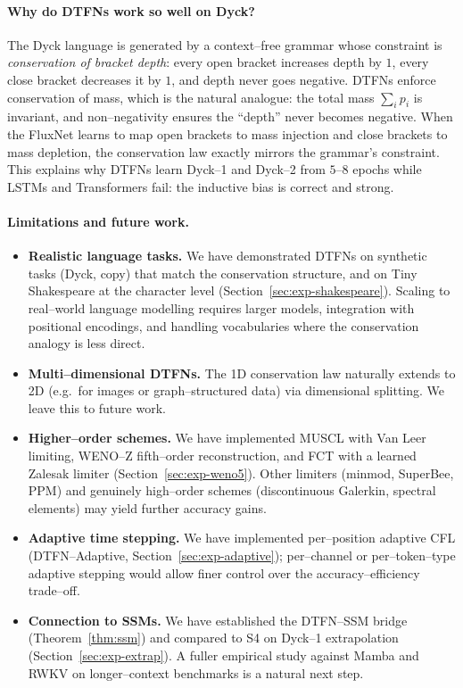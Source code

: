 \documentclass[10pt]{article}
\theoremstyle{definition}
\theoremstyle{remark}
\begin{document}
\paragraph{Why do DTFNs work so well on Dyck?}
The Dyck language is generated by a context--free grammar whose
constraint is \emph{conservation of bracket depth}: every open bracket
increases depth by $1$, every close bracket decreases it by $1$, and
depth never goes negative.  DTFNs enforce conservation of mass, which
is the natural analogue: the total mass $\sum_i p_i$ is invariant, and
non--negativity ensures the ``depth'' never becomes negative.  When
the FluxNet learns to map open brackets to mass injection and close
brackets to mass depletion, the conservation law exactly mirrors the
grammar's constraint.  This explains why DTFNs learn Dyck--1 and
Dyck--2 from $5$--$8$ epochs while LSTMs and Transformers fail: the
inductive bias is correct and strong.

\paragraph{Limitations and future work.}
\begin{itemize}[leftmargin=*,itemsep=2pt]
  \item \textbf{Realistic language tasks.}  We have demonstrated DTFNs
        on synthetic tasks (Dyck, copy) that match the conservation
        structure, and on Tiny Shakespeare at the character level
        (Section~\ref{sec:exp-shakespeare}).  Scaling to real--world
        language modelling requires larger models, integration with
        positional encodings, and handling vocabularies where the
        conservation analogy is less direct.
  \item \textbf{Multi--dimensional DTFNs.}  The 1D conservation law
        naturally extends to 2D (e.g.\ for images or graph--structured
        data) via dimensional splitting.  We leave this to future work.
  \item \textbf{Higher--order schemes.}  We have implemented MUSCL
        with Van Leer limiting, WENO--Z fifth--order reconstruction,
        and FCT with a learned Zalesak limiter
        (Section~\ref{sec:exp-weno5}).  Other limiters (minmod,
        SuperBee, PPM) and genuinely high--order schemes (discontinuous
        Galerkin, spectral elements) may yield further accuracy gains.
  \item \textbf{Adaptive time stepping.}  We have implemented
        per--position adaptive CFL (DTFN--Adaptive,
        Section~\ref{sec:exp-adaptive}); per--channel or
        per--token--type adaptive stepping would allow finer control
        over the accuracy--efficiency trade--off.
  \item \textbf{Connection to SSMs.}  We have established the DTFN--SSM
        bridge (Theorem~\ref{thm:ssm}) and compared to S4 on Dyck--1
        extrapolation (Section~\ref{sec:exp-extrap}).  A fuller
        empirical study against Mamba \cite{gu2023mamba} and RWKV
        \cite{peng2023rwkv} on longer--context benchmarks is a natural
        next step.
\end{itemize}
\end{document}
